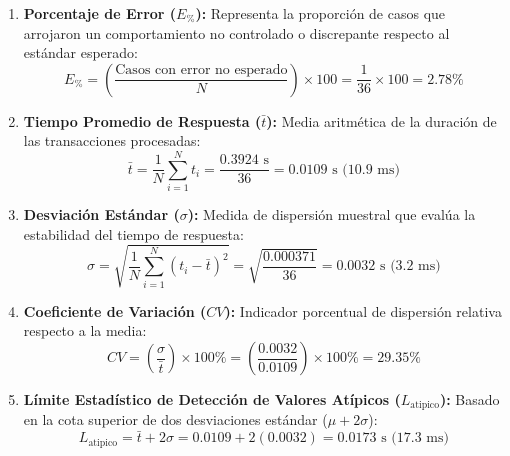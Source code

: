 \documentclass{article}
\begin{document}
\begin{enumerate}[leftmargin=*]
\item \textbf{Porcentaje de Error ($E_{\%}$):}
Representa la proporción de casos que arrojaron un comportamiento no controlado o discrepante respecto al estándar esperado:
\[
E_{\%} = \left( \frac{\text{Casos con error no esperado}}{N} \right) \times 100 = \frac{1}{36} \times 100 = 2.78\%
\]

\item \textbf{Tiempo Promedio de Respuesta ($\bar{t}$):}
Media aritmética de la duración de las transacciones procesadas:
\[
\bar{t} = \frac{1}{N} \sum_{i=1}^{N} t_i = \frac{0.3924\text{ s}}{36} = 0.0109\text{ s (10.9 ms)}
\]

\item \textbf{Desviación Estándar ($\sigma$):}
Medida de dispersión muestral que evalúa la estabilidad del tiempo de respuesta:
\[
\sigma = \sqrt{\frac{1}{N} \sum_{i=1}^{N} (t_i - \bar{t})^2} = \sqrt{\frac{0.000371}{36}} = 0.0032\text{ s (3.2 ms)}
\]

\item \textbf{Coeficiente de Variación ($CV$):}
Indicador porcentual de dispersión relativa respecto a la media:
\[
CV = \left( \frac{\sigma}{\bar{t}} \right) \times 100\% = \left( \frac{0.0032}{0.0109} \right) \times 100\% = 29.35\%
\]

\item \textbf{Límite Estadístico de Detección de Valores Atípicos ($L_{\text{atipico}}$):}
Basado en la cota superior de dos desviaciones estándar ($\mu + 2\sigma$):
\[
L_{\text{atipico}} = \bar{t} + 2\sigma = 0.0109 + 2(0.0032) = 0.0173\text{ s (17.3 ms)}
\]
\end{enumerate}
\end{document}
